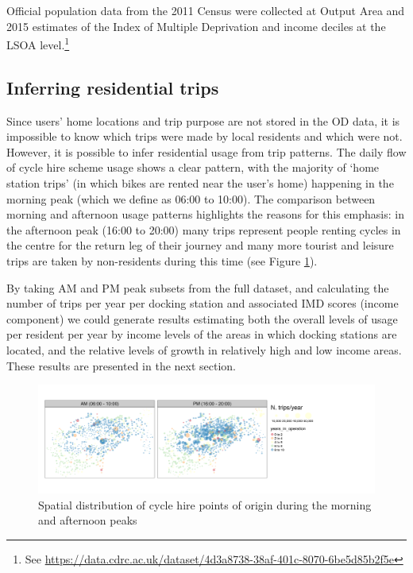 \documentclass[]{article}
\begin{document}
Official population data from the 2011 Census were collected at Output Area and 2015 estimates of the Index of Multiple Deprivation and income deciles at the LSOA level.\footnote{See \url{https://data.cdrc.ac.uk/dataset/4d3a8738-38af-401c-8070-6be5d85b2f5e}}

\hypertarget{inferring-residential-trips}{%
\subsection{Inferring residential trips}\label{inferring-residential-trips}}

Since users' home locations and trip purpose are not stored in the OD data, it is impossible to know which trips were made by local residents and which were not.
However, it is possible to infer residential usage from trip patterns.
The daily flow of cycle hire scheme usage shows a clear pattern, with the majority of `home station trips' (in which bikes are rented near the user's home) happening in the morning peak (which we define as 06:00 to 10:00).
The comparison between morning and afternoon usage patterns highlights the reasons for this emphasis: in the afternoon peak (16:00 to 20:00) many trips represent people renting cycles in the centre for the return leg of their journey and many more tourist and leisure trips are taken by non-residents during this time (see Figure \ref{fig:map-am-pm-peaks}).

By taking AM and PM peak subsets from the full dataset, and calculating the number of trips per year per docking station and associated IMD scores (income component) we could generate results estimating both the overall levels of usage per resident per year by income levels of the areas in which docking stations are located, and the relative levels of growth in relatively high and low income areas.
These results are presented in the next section.

\begin{figure}

{\centering \includegraphics[width=1\linewidth]{figures/map-am-pm-peaks} 

}

\caption{Spatial distribution of cycle hire points of origin during the morning and afternoon peaks}\label{fig:map-am-pm-peaks}
\end{figure}
\end{document}
